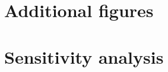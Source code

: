 \appendix
\chapter{Additional figures} \label{App:A}
\lipsum[1]


\chapter{Sensitivity analysis}\label{App:B}
\lipsum[2]
